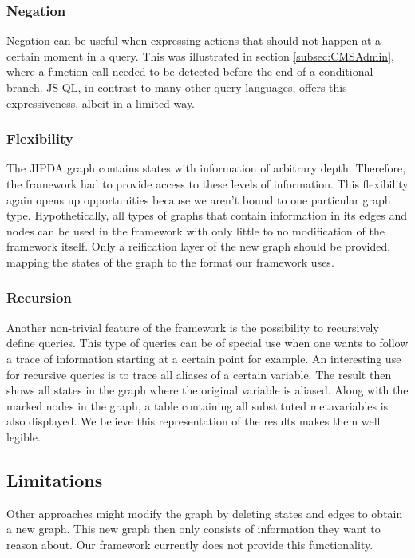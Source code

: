 \subsubsection*{Negation}
Negation can be useful when expressing actions that should not happen at a certain moment in a query. This was illustrated in section \ref{subsec:CMSAdmin}, where a function call needed to be detected before the end of a conditional branch. JS-QL, in contrast to many other query languages, offers this expressiveness, albeit in a limited way. 

\subsubsection*{Flexibility}
The JIPDA graph contains states with information of arbitrary depth. Therefore, the framework had to provide access to these levels of information. This flexibility again opens up opportunities because we aren't bound to one particular graph type. Hypothetically, all types of graphs that contain information in its edges and nodes can be used in the framework with only little to no modification of the framework itself. Only a reification layer of the new graph should be provided, mapping the states of the graph to the format our framework uses.

\subsubsection*{Recursion}
Another non-trivial feature of the framework is the possibility to recursively define queries. This type of queries can be of special use when one wants to follow a trace of information starting at a certain point for example. An interesting use for recursive queries is to trace all aliases of a certain variable. The result then shows all states in the graph where the original variable is aliased. Along with the marked nodes in the graph, a table containing all substituted metavariables is also displayed. We believe this representation of the results makes them well legible.

\subsection{Limitations}

Other approaches might modify the graph by deleting states and edges to obtain a new graph. This new graph then only consists of information they want to reason about. Our framework currently does not provide this functionality. 

